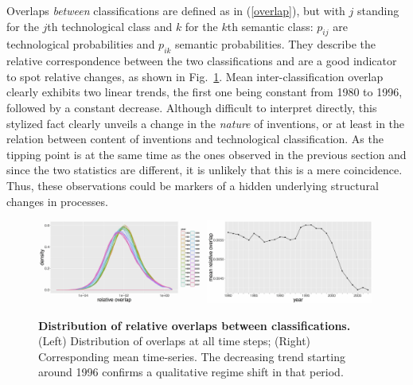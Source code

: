 \documentclass[12pt,twoside,a4paper]{article}
\begin{document}
Overlaps \emph{between} classifications are defined as in (\ref{overlap}), but with $j$ standing for the $j$th technological class and $k$ for the $k$th semantic class: $p_{ij}$ are technological probabilities and $p_{ik}$ semantic probabilities. They describe the relative correspondence between the two classifications and are a good indicator to spot relative changes, as shown in Fig.~\ref{fig:inter-classif-overlap}. Mean inter-classification overlap clearly exhibits two linear trends, the first one being constant from 1980 to 1996, followed by a constant decrease. Although difficult to interpret directly, this stylized fact clearly unveils a change in the \emph{nature} of inventions, or at least in the relation between content of inventions and technological classification. As the tipping point is at the same time as the ones observed in the previous section and since the two statistics are different, it is unlikely that this is a mere coincidence. Thus, these observations could be markers of a hidden underlying structural changes in processes. 




\begin{figure}[!ht]
\includegraphics[width=0.49\textwidth]{relative_interclassif_all_density_semcounts.jpg}
\includegraphics[width=0.49\textwidth]{relative_interclassif_all_ts_semcounts.jpg}
\caption{\textbf{Distribution of relative overlaps between classifications.} (Left) Distribution of overlaps at all time steps; (Right) Corresponding mean time-series. The decreasing trend starting around 1996 confirms a qualitative regime shift in that period.}
\label{fig:inter-classif-overlap}
\end{figure}
\end{document}
